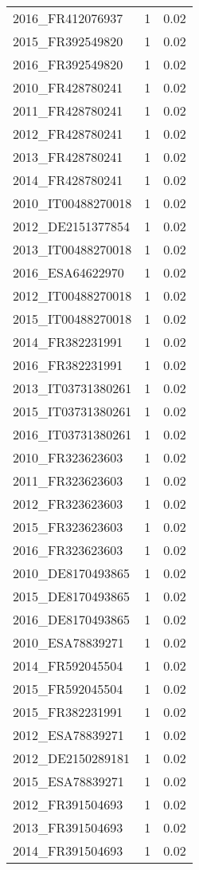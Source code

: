 \begin{table*}[htbp]
\begin{tabular}{lrr}
2016_FR412076937 & 1 & 0.02 \\
2015_FR392549820 & 1 & 0.02 \\
2016_FR392549820 & 1 & 0.02 \\
2010_FR428780241 & 1 & 0.02 \\
2011_FR428780241 & 1 & 0.02 \\
2012_FR428780241 & 1 & 0.02 \\
2013_FR428780241 & 1 & 0.02 \\
2014_FR428780241 & 1 & 0.02 \\
2010_IT00488270018 & 1 & 0.02 \\
2012_DE2151377854 & 1 & 0.02 \\
2013_IT00488270018 & 1 & 0.02 \\
2016_ESA64622970 & 1 & 0.02 \\
2012_IT00488270018 & 1 & 0.02 \\
2015_IT00488270018 & 1 & 0.02 \\
2014_FR382231991 & 1 & 0.02 \\
2016_FR382231991 & 1 & 0.02 \\
2013_IT03731380261 & 1 & 0.02 \\
2015_IT03731380261 & 1 & 0.02 \\
2016_IT03731380261 & 1 & 0.02 \\
2010_FR323623603 & 1 & 0.02 \\
2011_FR323623603 & 1 & 0.02 \\
2012_FR323623603 & 1 & 0.02 \\
2015_FR323623603 & 1 & 0.02 \\
2016_FR323623603 & 1 & 0.02 \\
2010_DE8170493865 & 1 & 0.02 \\
2015_DE8170493865 & 1 & 0.02 \\
2016_DE8170493865 & 1 & 0.02 \\
2010_ESA78839271 & 1 & 0.02 \\
2014_FR592045504 & 1 & 0.02 \\
2015_FR592045504 & 1 & 0.02 \\
2015_FR382231991 & 1 & 0.02 \\
2012_ESA78839271 & 1 & 0.02 \\
2012_DE2150289181 & 1 & 0.02 \\
2015_ESA78839271 & 1 & 0.02 \\
2012_FR391504693 & 1 & 0.02 \\
2013_FR391504693 & 1 & 0.02 \\
2014_FR391504693 & 1 & 0.02 \\

\end{tabular}
\end{table*}

